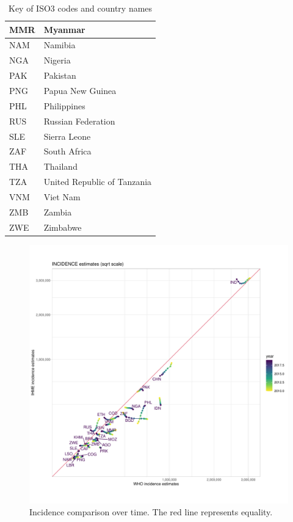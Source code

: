\documentclass[12pt]{article}
\begin{document}
\begin{table}[]
\begin{tabular}{|l|l|}
MMR           & Myanmar                               \\ \hline
NAM           & Namibia                               \\ \hline
NGA           & Nigeria                               \\ \hline
PAK           & Pakistan                              \\ \hline
PNG           & Papua New Guinea                      \\ \hline
PHL           & Philippines                           \\ \hline
RUS           & Russian Federation                    \\ \hline
SLE           & Sierra Leone                          \\ \hline
ZAF           & South Africa                          \\ \hline
THA           & Thailand                              \\ \hline
TZA           & United Republic of Tanzania           \\ \hline
VNM           & Viet Nam                              \\ \hline
ZMB           & Zambia                                \\ \hline
ZWE           & Zimbabwe                              \\ \hline
\end{tabular}
\caption{Key of ISO3 codes and country names}
\end{table}


\begin{figure}
  \centering
  \includegraphics[width=1\textwidth]{../plots/aF2a.pdf}
  \caption[Incidence comparison over time]{Incidence comparison over time. The
    red line represents equality.}
\end{figure}
\end{document}
